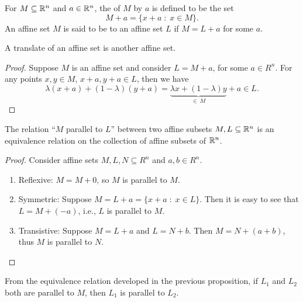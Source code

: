 \documentclass[11pt,a4paper]{article}
\begin{document}
\begin{definition}
    For $M\subseteq \mathbb{R}^n$ and $a\in \mathbb{R}^n$, the  of $M$ by $a$ is defined to be the set
    \begin{equation*}
        M + a = \{x+a\;:\;x\in M\}.
    \end{equation*}
    An affine set $M$ is said to be  to an affine set $L$ if $M = L + a$ for some $a$.
\end{definition}

\begin{proposition}\label{prop:affine_translate}
    A translate of an affine set is another affine set.
\end{proposition}

\begin{proof}
    Suppose $M$ is an affine set and consider $L = M + a$, for some $a\in R^n$. For any points $x,y\in M$, $x+a,y+a\in L$, then we have
    \begin{equation*}
        \lambda (x+a) + (1-\lambda) (y+a) = \underbrace{\lambda x + (1-\lambda) y}_{\in\ M} + a \in L.
    \end{equation*}
\end{proof}

\begin{proposition}
    The relation ``$M$ parallel to $L$'' between two affine subsets $M, L\subseteq \mathbb{R}^n$ is an equivalence relation on the collection of affine subsets of $\mathbb{R}^n$.
\end{proposition}

\begin{proof}
    Consider affine sets $M,L,N\subseteq R^n$ and $a,b\in R^n$.
    \begin{enumerate}[i]
        \item Reflexive: $M = M+0$, so $M$ is parallel to $M$.
        \item Symmetric: Suppose $M = L+a = \{x+a\;:\; x\in L \}$. Then it is easy to see that $L = M + (-a)$, i.e., $L$ is parallel to $M$.
        \item Transistive: Suppose $M = L + a$ and $L = N + b$. Then $M = N + (a+b)$, thus $M$ is parallel to $N$.
    \end{enumerate}
\end{proof}

\begin{remark}
    From the equivalence relation developed in the previous proposition, if $L_1$ and $L_2$ both are parallel to $M$, then $L_1$ is parallel to $L_2$.
\end{remark}
\end{document}

